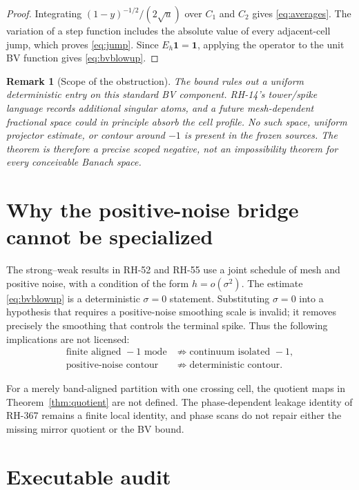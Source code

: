 \documentclass[11pt]{article}
\newtheorem{remark}[theorem]{Remark}
\begin{document}
\begin{proof}
Integrating $(1-y)^{-1/2}/(2\sqrt u)$ over $C_1$ and $C_2$ gives
\eqref{eq:averages}.  The variation of a step function includes the
absolute value of every adjacent-cell jump, which proves \eqref{eq:jump}.
Since $E_h\mathbf1=\mathbf1$, applying the operator to the unit BV
function gives \eqref{eq:bvblowup}.
\end{proof}

\begin{remark}[Scope of the obstruction]
The bound rules out a uniform deterministic entry on this standard BV
component.  RH-14's tower/spike language records additional singular atoms,
and a future mesh-dependent fractional space could in principle absorb the
cell profile.  No such space, uniform projector estimate, or contour around
$-1$ is present in the frozen sources.  The theorem is therefore a precise
scoped negative, not an impossibility theorem for every conceivable Banach
space.
\end{remark}

\section{Why the positive-noise bridge cannot be specialized}

The strong--weak results in RH-52 and RH-55 use a joint schedule of mesh and
positive noise, with a condition of the form $h=o(\sigma^2)$.  The estimate
\eqref{eq:bvblowup} is a deterministic $\sigma=0$ statement.  Substituting
$\sigma=0$ into a hypothesis that requires a positive-noise smoothing scale
is invalid; it removes precisely the smoothing that controls the terminal
spike.  Thus the following implications are not licensed:
\begin{align*}
 \text{finite aligned }-1\text{ mode}
 &\not\Rightarrow \text{continuum isolated }-1,\\
 \text{positive-noise contour}
 &\not\Rightarrow \text{deterministic contour}.
\end{align*}

For a merely band-aligned partition with one crossing cell, the quotient maps
in Theorem~\ref{thm:quotient} are not defined.  The phase-dependent leakage
identity of RH-367 remains a finite local identity, and phase scans do not
repair either the missing mirror quotient or the BV bound.

\section{Executable audit}
\end{document}

